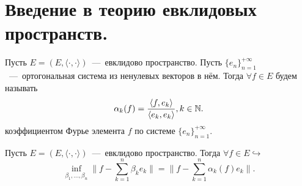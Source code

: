\section{Введение в теорию евклидовых пространств.}
\begin{definition}
    Пусть $E = (E, \langle \cdot, \cdot \rangle)$~---~евклидово пространство. Пусть $\{e_n\}_{n = 1}^{+\infty}$~---~ортогональная система из ненулевых векторов в нём.
    Тогда $\forall f \in E$ будем называть
    \begin{equation*}
        \alpha_k(f) = \dfrac{\langle f, e_k \rangle}{\langle e_k, e_k \rangle}, k \in \mathbb{N}.
    \end{equation*}
    коэффициентом Фурье элемента $f$ по системе $\{e_n\}_{n = 1}^{+\infty}$.
\end{definition}
\begin{theorem}
    Пусть $E = (E, \langle \cdot, \cdot \rangle)$~---~евклидово пространство. Тогда $\forall f \in E \hookrightarrow$
    \begin{equation*}
        \inf\limits_{\beta_1, \ldots, \beta_n} \bigr\|f - \sum\limits_{k = 1}^n \beta_k e_k\bigr\| = \bigr\|f - \sum\limits_{k = 1}^n \alpha_k(f)e_k\bigr\|.
    \end{equation*}
\end{theorem}
